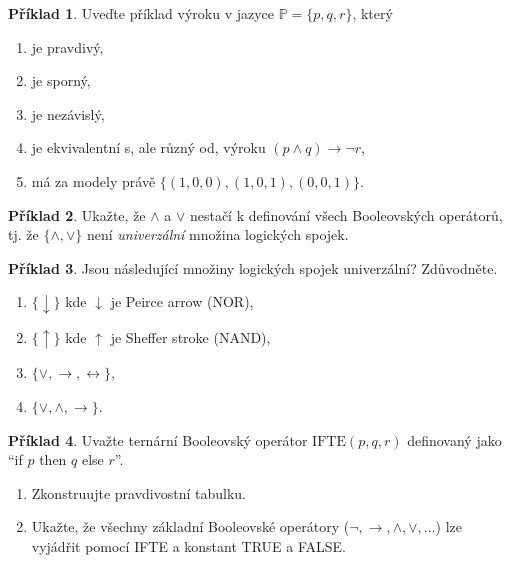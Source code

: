 \documentclass[a4paper]{article}
\theoremstyle{definition}
\newtheorem{problem}{Příklad}
\begin{document}
\medskip\begin{problem}
    Uveďte příklad výroku v jazyce $\mathbb P=\{p,q,r\}$, který
    \begin{enumerate}
    \item je pravdivý,
    \item je sporný,
    \item je nezávislý,
    \item je ekvivalentní s, ale různý od, výroku $(p\wedge q)\to\neg r$,
    \item má za modely právě $\{(1,0,0),(1,0,1),(0,0,1)\}$.
    \end{enumerate}
\end{problem}


\medskip\begin{problem}
Ukažte, že $\wedge$ a $\vee$ nestačí k definování všech Booleovských operátorů, tj. že $\{\wedge,\vee\}$ není \emph{univerzální} množina logických spojek.
\end{problem}

\medskip\begin{problem} Jsou následující množiny logických spojek univerzální? Zdůvodněte.
\begin{enumerate}
    \item $\{\downarrow\}$ kde $\downarrow$ je Peirce arrow (NOR),
    \item $\{\uparrow\}$ kde $\uparrow$ je Sheffer stroke (NAND),
    \item $\{\vee, \rightarrow, \leftrightarrow\}$,
    \item $\{\vee, \wedge, \rightarrow\}$.
\end{enumerate}
\end{problem}


\medskip\begin{problem}
Uvažte ternární Booleovský operátor $\mathrm{IFTE}(p, q, r)$ definovaný jako ``if $p$ then $q$ else $r$''. 
\begin{enumerate}
    \item Zkonstruujte pravdivostní tabulku.
    \item Ukažte, že všechny základní Booleovské operátory ($\neg, \to, \wedge,\vee,\dots$) lze vyjádřit pomocí IFTE a konstant TRUE a FALSE.
\end{enumerate}  
\end{problem}
\end{document}
